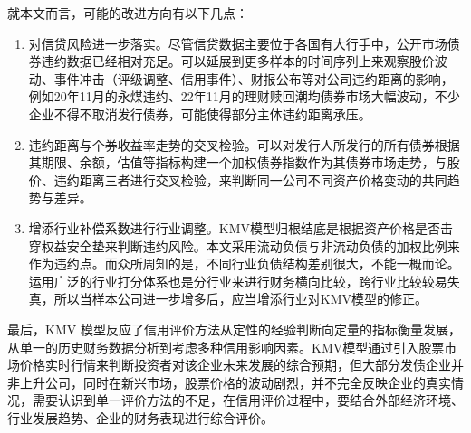 \documentclass[a4paper,12pt]{ctexart}
\begin{document}
就本文而言，可能的改进方向有以下几点：
\begin{enumerate}
    \item 对信贷风险进一步落实。尽管信贷数据主要位于各国有大行手中，公开市场债券违约数据已经相对充足。可以延展到更多样本的时间序列上来观察股价波动、事件冲击（评级调整、信用事件）、财报公布等对公司违约距离的影响，例如20年11月的永煤违约、22年11月的理财赎回潮均债券市场大幅波动，不少企业不得不取消发行债券，可能使得部分主体违约距离承压。
    \item 违约距离与个券收益率走势的交叉检验。可以对发行人所发行的所有债券根据其期限、余额，估值等指标构建一个加权债券指数作为其债券市场走势，与股价、违约距离三者进行交叉检验，来判断同一公司不同资产价格变动的共同趋势与差异。
    \item 增添行业补偿系数进行行业调整。KMV模型归根结底是根据资产价格是否击穿权益安全垫来判断违约风险。本文采用流动负债与非流动负债的加权比例来作为违约点。而众所周知的是，不同行业负债结构差别很大，不能一概而论。运用广泛的行业打分体系也是分行业来进行财务横向比较，跨行业比较较易失真，所以当样本公司进一步增多后，应当增添行业对KMV模型的修正。
\end{enumerate}

最后，KMV 模型反应了信用评价方法从定性的经验判断向定量的指标衡量发展，从单一的历史财务数据分析到考虑多种信用影响因素。KMV模型通过引入股票市场价格实时行情来判断投资者对该企业未来发展的综合预期，但大部分发债企业并非上升公司，同时在新兴市场，股票价格的波动剧烈，并不完全反映企业的真实情况，需要认识到单一评价方法的不足，在信用评价过程中，要结合外部经济环境、行业发展趋势、企业的财务表现进行综合评价。
\nocite{*}
\appendix
\printbibliography%
\end{document}

